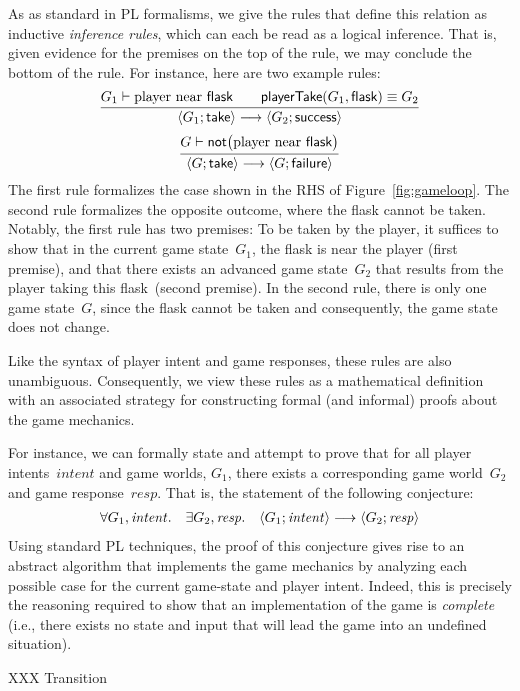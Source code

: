 As as standard in PL formalisms, we give the rules that define this
relation as inductive \emph{inference rules}, which can each be read
as a logical inference.  That is, given evidence for the premises on
the top of the rule, we may conclude the bottom of the rule.
%
For instance, here are two example rules:
\[
\infer{
  \GameStep{G_1}{\ctake}{G_2}{\textsf{success}}
}{ 
  G_1 \vdash \textrm{player near}~\textsf{flask}
  \quad
  \quad
  \textsf{playerTake}(G_1,\textsf{flask}) \equiv G_2
}
\]
\[
\infer{
  \GameStep{G}{\ctake}{G}{\textsf{failure}}
}{
  G \vdash \textsf{not}\big( \textrm{player near}~\textsf{flask} \big)
}
\]
The first rule formalizes the case shown in the RHS of
Figure~\ref{fig:gameloop}.
%
The second rule formalizes the opposite outcome, where the flask
cannot be taken.
%
Notably, the first rule has two premises: To be taken by the player,
it suffices to show that in the current game state~$G_1$, the flask is
near the player (first premise), and that there exists an advanced
game state~$G_2$ that results from the player taking this flask~(second premise).
%
In the second rule, there is only one game state~$G$, since the flask
cannot be taken and consequently, the game state does not change.

Like the syntax of player intent and game responses, these rules are
also unambiguous.
%
Consequently, we view these rules as a mathematical definition with an
associated strategy for constructing formal (and informal) proofs
about the game mechanics.

For instance, we can formally state and attempt to prove that for all
player intents~$\mathit{intent}$ and game worlds, $G_1$, there exists
a corresponding game world~$G_2$ and game response~$\mathit{resp}$.
%
That is, the statement of the following conjecture:
\[
\begin{array}{ccc}
\forall G_1, \mathit{intent}.
&
\exists G_2, \mathit{resp}.
&\left< G_1; \mathit{intent} \right> \longrightarrow \left< G_2; \mathit{resp} \right>
\end{array}
\]
Using standard PL techniques, the proof of this conjecture gives rise
to an abstract algorithm that implements the game mechanics by
analyzing each possible case for the current game-state and player
intent.
%
Indeed, this is precisely the reasoning required to show that an
implementation of the game is \emph{complete} (i.e., there exists no
state and input that will lead the game into an undefined situation).


XXX 
Transition

